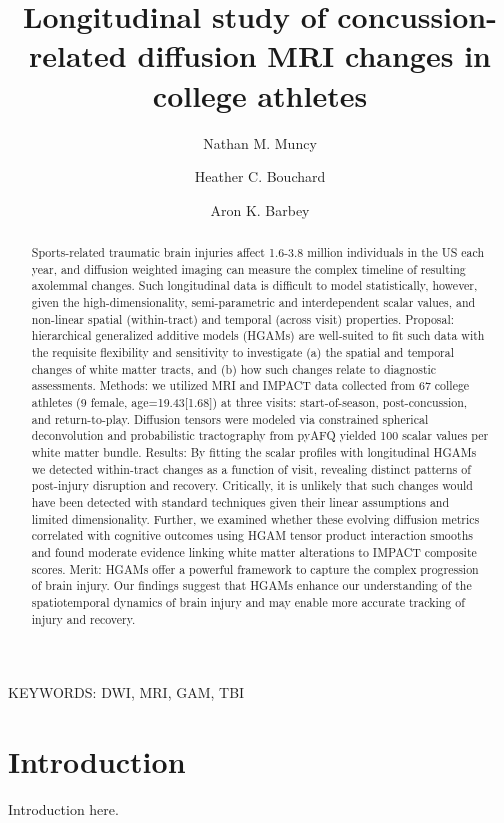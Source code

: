 \documentclass[12pt]{article}
\title{Longitudinal study of concussion-related diffusion MRI changes in college athletes}
\date{}
\author[1,*]{Nathan M. Muncy}
\author[1]{Heather C. Bouchard}
\author[1]{Aron K. Barbey}
\affil[1]{Center for Brain, Behavior and Biology, University of Nebraska-Lincoln, Lincoln, Nebraska, USA}
\affil[*]{Corresponding author.	Email: nmuncy2@unl.edu}
\begin{document}
\maketitle
\pagebreak


\begin{abstract}


Sports-related traumatic brain injuries affect 1.6-3.8 million individuals in the US each year, and diffusion weighted imaging can measure the complex timeline of resulting axolemmal changes. Such longitudinal data is difficult to model statistically, however, given the high-dimensionality, semi-parametric and interdependent scalar values, and non-linear spatial (within-tract) and temporal (across visit) properties. Proposal: hierarchical generalized additive models (HGAMs) are well-suited to fit such data with the requisite flexibility and sensitivity to investigate (a) the spatial and temporal changes of white matter tracts, and (b) how such changes relate to diagnostic assessments. Methods: we utilized MRI and IMPACT data collected from 67 college athletes (9 female, age=19.43[1.68]) at three visits: start-of-season, post-concussion, and return-to-play. Diffusion tensors were modeled via constrained spherical deconvolution and probabilistic tractography from pyAFQ yielded 100 scalar values per white matter bundle. Results: By fitting the scalar profiles with longitudinal HGAMs we detected within-tract changes as a function of visit, revealing distinct patterns of post-injury disruption and recovery. Critically, it is unlikely that such changes would have been detected with standard techniques given their linear assumptions and limited dimensionality. Further, we examined whether these evolving diffusion metrics correlated with cognitive outcomes using HGAM tensor product interaction smooths and found moderate evidence linking white matter alterations to IMPACT composite scores. Merit: HGAMs offer a powerful framework to capture the complex progression of brain injury. Our findings suggest that HGAMs enhance our understanding of the spatiotemporal dynamics of brain injury and may enable more accurate tracking of injury and recovery.

\end{abstract}

\vfill
KEYWORDS: DWI, MRI, GAM, TBI\\
\pagebreak


\section{Introduction}
\label{sec:intro}
Introduction here.
\end{document}

